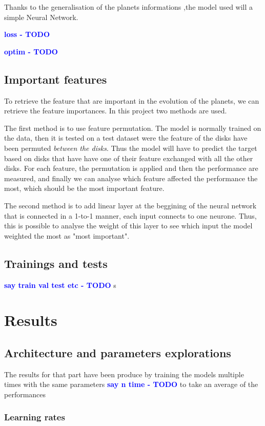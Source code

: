 \documentclass[a4paper, 11pt]{article}
\newcommand{\todonote}[3] {
	\textbf{\textcolor{#2}{#3 - #1}}
}
\newcommand{\todo}[1] {\todonote{TODO}{blue}{#1}}
\begin{document}
    Thanks to the generalisation of the planets informations ,the model used will a simple Neural Network.
    
    \todo{loss}
    \todo{optim}
    
    \subsection{Important features}
    
    To retrieve the feature that are important in the evolution of the planets, we can retrieve the feature importances. In this project two methods are used.
    
    The first method is to use feature permutation. The model is normally trained on the data, then it is tested on a test dataset were the feature of the disks have been permuted \textit{between the disks}. Thus the model will have to predict the target based on disks that have have one of their feature exchanged with all the other disks. For each feature, the permutation is applied and then the performance are measured, and finally we can analyse which feature affected the performance the most, which should be the most important feature.
    
    The second method is to add linear layer at the beggining of the neural network that is connected in a 1-to-1 manner, each input connects to one neurone. Thus, this is possible to analyse the weight of this layer to see which input the model weighted the most as "most important".
    
        \subsection{Trainings and tests}
        
        \todo{say train val test etc}s
    
    
    \section{Results}
    
   
    \subsection{Architecture and  parameters explorations}
 	The results for that part have been produce by training the models multiple times with the same parameters \todo{say n time} to take an average of the performances
    \subsubsection{Learning rates}
    
\end{document}
